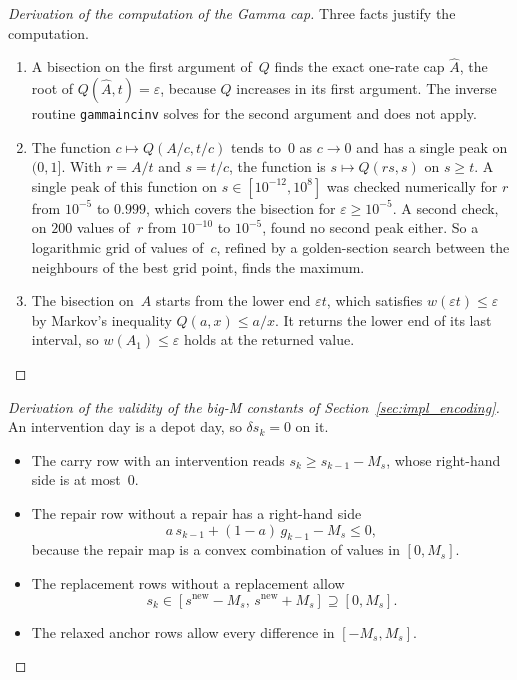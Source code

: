 \documentclass[11pt,a4paper]{article}
\theoremstyle{plain}
\theoremstyle{definition}
\theoremstyle{remark}
\begin{document}
\label{drv:gamma_computation}
\begin{proof}[Derivation of the computation of the Gamma cap]
Three facts justify the computation.
\begin{enumerate}
  \item A bisection on the first argument of~$Q$ finds the exact one-rate cap $\hat A$, the root of $Q(\hat A, t) = \varepsilon$, because $Q$ increases in its first argument.
    The inverse routine \texttt{gammaincinv} solves for the second argument and does not apply.
  \item The function $c \mapsto Q(A/c, t/c)$ tends to~$0$ as $c \to 0$ and has a single peak on $(0, 1]$.
    With $r = A/t$ and $s = t/c$, the function is $s \mapsto Q(rs, s)$ on $s \ge t$. A single peak of this function on $s \in [10^{-12}, 10^{8}]$ was checked numerically for $r$ from $10^{-5}$ to $0.999$, which covers the bisection for $\varepsilon \ge 10^{-5}$.
    A second check, on $200$ values of~$r$ from $10^{-10}$ to $10^{-5}$, found no second peak either.
    So a logarithmic grid of values of~$c$, refined by a golden-section search between the neighbours of the best grid point, finds the maximum.
  \item The bisection on~$A$ starts from the lower end $\varepsilon t$, which satisfies $w(\varepsilon t) \le \varepsilon$ by Markov's inequality $Q(a, x) \le a/x$.
    It returns the lower end of its last interval, so $w(A_1) \le \varepsilon$ holds at the returned value.
\end{enumerate}
\end{proof}

\label{drv:bigM_validity}
\begin{proof}[Derivation of the validity of the big-M constants of Section~\ref{sec:impl_encoding}]
An intervention day is a depot day, so $\delta s_k = 0$ on it.
\begin{itemize}
  \item The carry row with an intervention reads $s_k \ge s_{k-1} - M_s$, whose right-hand side is at most~$0$.
  \item The repair row without a repair has a right-hand side
    \begin{equation}
      a\,s_{k-1} + (1-a)\,g_{k-1} - M_s \le 0,
    \end{equation}
    because the repair map is a convex combination of values in $[0, M_s]$.
  \item The replacement rows without a replacement allow
    \begin{equation}
      s_k \in [s^{\mathrm{new}} - M_s,\, s^{\mathrm{new}} + M_s] \supseteq [0, M_s].
    \end{equation}
  \item The relaxed anchor rows allow every difference in $[-M_s, M_s]$.
\end{itemize}
\end{proof}
\end{document}
